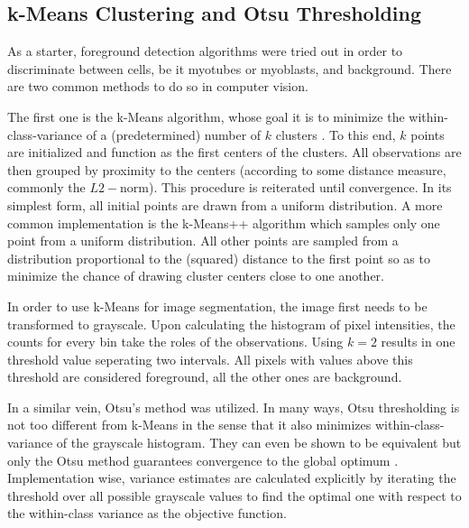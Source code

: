 \subsection{k-Means Clustering and Otsu Thresholding}
As a starter, foreground detection algorithms were tried out in order to discriminate between cells, be it myotubes or myoblasts, and background. There are two common methods to do so in computer vision. 

The first one is the k-Means algorithm, whose goal it is to minimize the within-class-variance of a (predetermined) number of $k$ clusters \cite{bishop2006}. To this end, $k$ points are initialized and function as the first centers of the clusters. All observations are then grouped by proximity to the centers (according to some distance measure, commonly the $L2-$norm). This procedure is reiterated until convergence. In its simplest form, all initial points are drawn from a uniform distribution. A more common implementation is the k-Means++ algorithm \cite{kmeans} which samples only one point from a uniform distribution. All other points are sampled from a distribution proportional to the (squared) distance to the first point so as to minimize the chance of drawing cluster centers close to one another.

In order to use k-Means for image segmentation, the image first needs to be transformed to grayscale. Upon calculating the histogram of pixel intensities, the counts for every bin take the roles of the observations. Using $k = 2$ results in one threshold value seperating two intervals. All pixels with values above this threshold are considered foreground, all the other ones are background.

In a similar vein, Otsu's method \cite{otsu} was utilized. In many ways, Otsu thresholding is not too different from k-Means in the sense that it also minimizes within-class-variance of the grayscale histogram. They can even be shown to be equivalent but only the Otsu method guarantees convergence to the global optimum \cite{liu2009otsu}. Implementation wise, variance estimates are calculated explicitly by iterating the threshold over all possible grayscale values to find the optimal one with respect to the within-class variance as the objective function.

